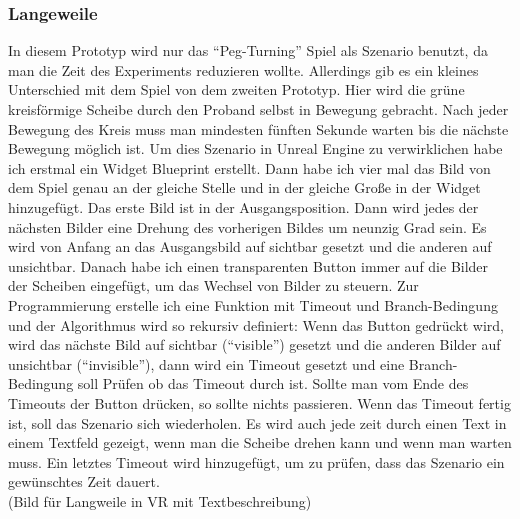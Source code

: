 \subsubsection{Langeweile} \label{langeweile-4}





In diesem Prototyp wird nur das ``Peg-Turning'' Spiel als Szenario benutzt, da man die Zeit des Experiments reduzieren wollte. Allerdings gib es ein kleines Unterschied mit dem Spiel von dem zweiten Prototyp. Hier wird die grüne kreisförmige Scheibe durch den Proband selbst in Bewegung gebracht. Nach jeder Bewegung des Kreis muss man mindesten fünften Sekunde warten bis die nächste Bewegung möglich ist. 
 Um dies Szenario in Unreal Engine zu verwirklichen habe ich erstmal ein Widget Blueprint erstellt. Dann habe ich vier mal das Bild von dem Spiel genau an der gleiche Stelle und in der gleiche Große in der Widget hinzugefügt. Das erste Bild ist in der Ausgangsposition. Dann wird jedes der nächsten Bilder eine Drehung des vorherigen Bildes um neunzig Grad sein. Es wird von Anfang an das Ausgangsbild auf sichtbar gesetzt und die anderen auf unsichtbar. Danach habe ich einen transparenten Button immer auf die Bilder der Scheiben eingefügt, um das Wechsel von Bilder zu steuern. Zur Programmierung erstelle ich eine Funktion mit Timeout und Branch-Bedingung und der Algorithmus wird so rekursiv definiert:  Wenn das Button gedrückt wird, wird das nächste Bild auf sichtbar (``visible'') gesetzt und die anderen Bilder auf unsichtbar (``invisible''), dann wird ein Timeout gesetzt und eine Branch-Bedingung soll Prüfen ob das Timeout durch ist. Sollte man vom Ende des Timeouts der Button drücken, so sollte nichts passieren. Wenn das Timeout fertig ist, soll das Szenario sich wiederholen. Es wird auch jede zeit durch einen Text in einem Textfeld gezeigt, wenn man die Scheibe drehen kann und wenn man warten muss. Ein letztes Timeout wird hinzugefügt, um zu prüfen, dass das Szenario ein gewünschtes Zeit dauert. \\

(Bild für Langweile in VR mit Textbeschreibung)